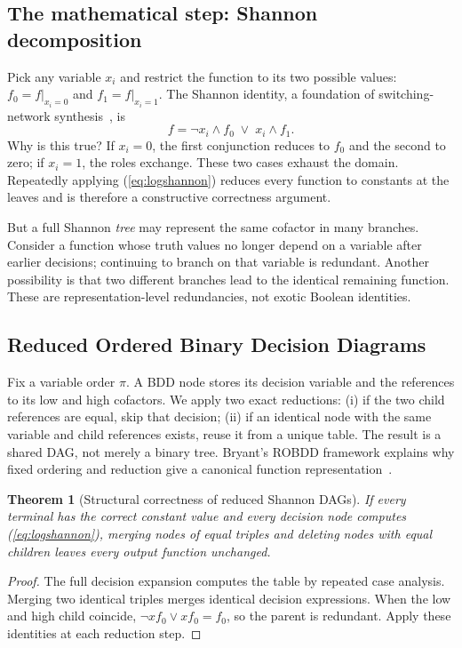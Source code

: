 \documentclass[a4paper,10pt]{article}
\newtheorem{theorem}{Theorem}
\theoremstyle{definition}
\theoremstyle{remark}
\begin{document}
\subsection{The mathematical step: Shannon decomposition}
Pick any variable $x_i$ and restrict the function to its two possible values: $f_0=f|_{x_i=0}$ and $f_1=f|_{x_i=1}$. The Shannon identity, a foundation of switching-network synthesis~\cite{shannon1949}, is
\begin{equation}\label{eq:logshannon}
 f=\neg x_i\land f_0\;\lor\;x_i\land f_1.
\end{equation}
Why is this true? If $x_i=0$, the first conjunction reduces to $f_0$ and the second to zero; if $x_i=1$, the roles exchange. These two cases exhaust the domain. Repeatedly applying (\ref{eq:logshannon}) reduces every function to constants at the leaves and is therefore a constructive correctness argument.

But a full Shannon \emph{tree} may represent the same cofactor in many branches. Consider a function whose truth values no longer depend on a variable after earlier decisions; continuing to branch on that variable is redundant. Another possibility is that two different branches lead to the identical remaining function. These are representation-level redundancies, not exotic Boolean identities.

\subsection{Reduced Ordered Binary Decision Diagrams}
Fix a variable order $\pi$. A BDD node stores its decision variable and the references to its low and high cofactors. We apply two exact reductions: (i) if the two child references are equal, skip that decision; (ii) if an identical node with the same variable and child references exists, reuse it from a unique table. The result is a shared DAG, not merely a binary tree. Bryant's ROBDD framework explains why fixed ordering and reduction give a canonical function representation~\cite{bryant1986}.

\begin{theorem}[Structural correctness of reduced Shannon DAGs]
If every terminal has the correct constant value and every decision node computes (\ref{eq:logshannon}), merging nodes of equal triples and deleting nodes with equal children leaves every output function unchanged.
\end{theorem}
\begin{proof}
The full decision expansion computes the table by repeated case analysis. Merging two identical triples merges identical decision expressions. When the low and high child coincide, $\neg x f_0\lor xf_0=f_0$, so the parent is redundant. Apply these identities at each reduction step.\end{proof}
\end{document}
